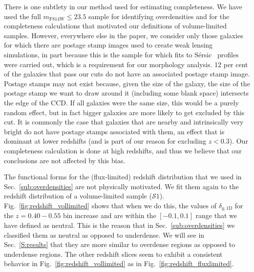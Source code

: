 \documentclass[twocolumn,useAMS,usenatbib]{mn2e}
\newcommand{\sersic}{S\'{e}rsic }
\newcommand{\s}{\ensuremath{\mathcal{S}}}
\begin{document}
There is one subtlety in our method used for estimating
completeness. We have used the full $m_\text{F814W}\le23.5$ sample
for identifying
overdensities and for the completeness calculations that motivated our
definitions of volume-limited samples.  However, everywhere else in the paper, we consider only those galaxies for which there are postage stamp
images used to create weak lensing simulations, in part because this is the
sample for which fits to \sersic\ profiles were carried out, which is a
requirement for our morphology analysis.  
12 per cent of the galaxies that pass our cuts do not have an
associated postage stamp image.
Postage stamps may not exist because, given the size of the galaxy,
the size of the postage stamp we want to draw around it (including
some blank space) intersects the edge of the CCD.
If all galaxies were the same size, this would be a purely random effect, but in fact bigger galaxies are more likely to get excluded by this cut. 
It is commonly the case that  galaxies that are nearby and
intrinsically very bright do not have postage stamps associated with
them, an effect that is dominant at lower redshifts (and is part of
our reason for excluding $z<0.3$). 
Our completeness calculation is done at high redshifts, and thus we
believe that our conclusions are not affected by this bias.  


The functional forms for the (flux-limited) redshift distribution that we used in Sec.~\ref{sub:overdensities} are not physically motivated. We fit them again to the  
redshift distribution of a volume-limited sample
(\s$1$). Fig.~\ref{fig:redshift_vollimited} shows that when we do
this, the values of $\delta_{g,\text{1D}}$ for the $z=0.40-0.55$ bin
increase and are within the $[-0.1, 0.1]$ range that we have defined
as neutral. This is the reason that in Sec.~\ref{sub:overdensities} we classified them as neutral as opposed to underdense.
We will see in Sec.~\ref{S:results} that they are more similar to overdense regions as opposed to underdense regions.
The other redshift slices seem to exhibit a consistent behavior in
Fig.~\ref{fig:redshift_vollimited} as in Fig.~\ref{fig:redshift_fluxlimited}. 
\end{document}
